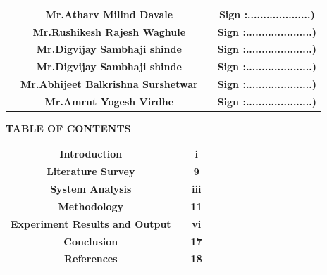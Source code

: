 \documentclass[12pt]{article}
\begin{document}
   
 \begin{tabular}{ c c c c } 
  \hspace{0.4in}&\textbf{Mr.Atharv Milind Davale} & \hspace{0.5in}  & \textbf{ Sign :....................)} \\ [1mm] 
  \hspace{0.4in} &\textbf {Mr.Rushikesh Rajesh Waghule}& \hspace{0.5in}   & \textbf{Sign :.....................) }\\[1mm]
  \hspace{0.4in}  &\textbf{ Mr.Digvijay Sambhaji shinde } & \hspace{0.5in}  & \textbf{Sign :.....................) }\\[1mm]
  \hspace{0.4in}  &\textbf{ Mr.Digvijay Sambhaji shinde } & \hspace{0.5in}  & \textbf{Sign :.....................) }\\[1mm]
  \hspace{0.4in}  &\textbf{ Mr.Abhijeet Balkrishna Surshetwar} & \hspace{0.5in}  & \textbf{Sign :.....................) }\\[1mm]
  \hspace{0.4in}  &\textbf{ Mr.Amrut Yogesh Virdhe } & \hspace{0.5in}  & \textbf{Sign :.....................) }\\[7mm]
 \end{tabular}   


\clearpage


\begin{center}
 \Large \textbf {TABLE OF CONTENTS }\\[15mm]
 \end{center}


\begin{tabular}{ c c c c } 
  \textbf{Introduction} & \hspace{2.5in}  & \textbf{i} \\ [5mm] 
  \textbf{Literature Survey} & \hspace{2.5in}  & \textbf{9} \\ [5mm]
  \textbf{System Analysis} & \hspace{2.5in}  & \textbf{iii} \\ [5mm] 
  \textbf{Methodology} & \hspace{2.5in}  & \textbf{11} \\ [5mm] 
  \textbf{Experiment Results and Output} & \hspace{2.5in}  & \textbf{vi} \\ [5mm] 
  \textbf{Conclusion} & \hspace{2.5in}  & \textbf{17} \\ [5mm] 
  \textbf{References} & \hspace{2.5in}  & \textbf{18} \\ [5mm]  
 \end{tabular}  
\end{document}
